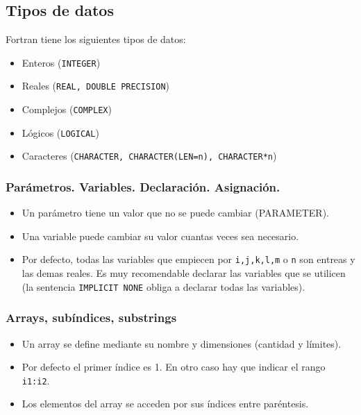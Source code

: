 \subsection{Tipos de datos}

Fortran tiene los siguientes tipos de datos:

\begin{itemize}
	\item Enteros ({\tt INTEGER})
	\item Reales ({\tt REAL, DOUBLE PRECISION})
	\item Complejos ({\tt COMPLEX})
	\item Lógicos ({\tt LOGICAL})
	\item Caracteres ({\tt CHARACTER, CHARACTER(LEN=n), CHARACTER*n})
\end{itemize}

\subsubsection{Parámetros. Variables. Declaración. Asignación.}

\begin{itemize}
	\item Un parámetro tiene un valor que no se puede cambiar (PARAMETER).
	\item Una variable puede cambiar su valor cuantas veces sea necesario.
	\item Por defecto, todas las variables que empiecen por \texttt{i,j,k,l,m} o \texttt{n} son entreas y las demas reales. Es muy recomendable declarar las variables que se utilicen (la sentencia {\tt IMPLICIT NONE} obliga a declarar todas las variables).
\end{itemize}

\subsubsection{Arrays, subíndices, substrings}

\begin{itemize}
	\item Un array se define mediante su nombre y dimensiones (cantidad y límites).
	\item Por defecto el primer índice es 1. En otro caso hay que indicar el rango {\tt i1:i2}.
	\item Los elementos del array se acceden por sus índices entre paréntesis.
\end{itemize}



